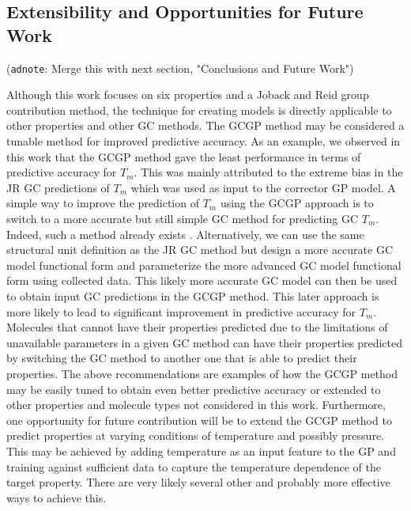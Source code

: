 \documentclass[journal=jacsat,manuscript=article]{achemso}
\newcommand{\adnote}[1]{{\color{OliveGreen} (\texttt{adnote}: #1)}}
\begin{document}
\subsection{Extensibility and Opportunities for Future Work}
\adnote{Merge this with next section, "Conclusions and Future Work"}

Although this work focuses on six properties and a Joback and Reid group contribution method, the technique for creating models is directly applicable to other properties and other GC methods. 
The GCGP method may be considered a tunable method for improved predictive accuracy. As an example, we observed in this work that the GCGP method gave the least performance in terms of predictive accuracy for $T_m$. This was mainly attributed to the extreme bias in the JR GC predictions of $T_m$ which was used as input to the corrector GP model. A simple way to improve the prediction of $T_m$ using the GCGP approach is to switch to a more accurate but still simple GC method for predicting GC $T_m$. Indeed, such a method already exists \cite{perezponceNewGroupContribution2013}. Alternatively, we can use the same structural unit definition as the JR GC method but design a more accurate GC model functional form and parameterize the more advanced GC model functional form using collected data. This likely more accurate GC model can then be used to obtain input GC predictions in the GCGP method. This later approach is more likely to lead to significant improvement in predictive accuracy for $T_m$. Molecules that cannot have their properties predicted due to the limitations of unavailable parameters in a given GC method can have their properties predicted by switching the GC method to another one that is able to predict their properties. The above recommendations are examples of how the GCGP method may be easily tuned to obtain even better predictive accuracy or extended to other properties and molecule types not considered in this work. 
Furthermore, one opportunity for future contribution will be to extend the GCGP method to predict properties at varying conditions of temperature and possibly pressure. This may be achieved by adding temperature as an input feature to the GP and training against sufficient data to capture the temperature dependence of the target property. There are very likely several other and probably more effective ways to achieve this.
\end{document}
